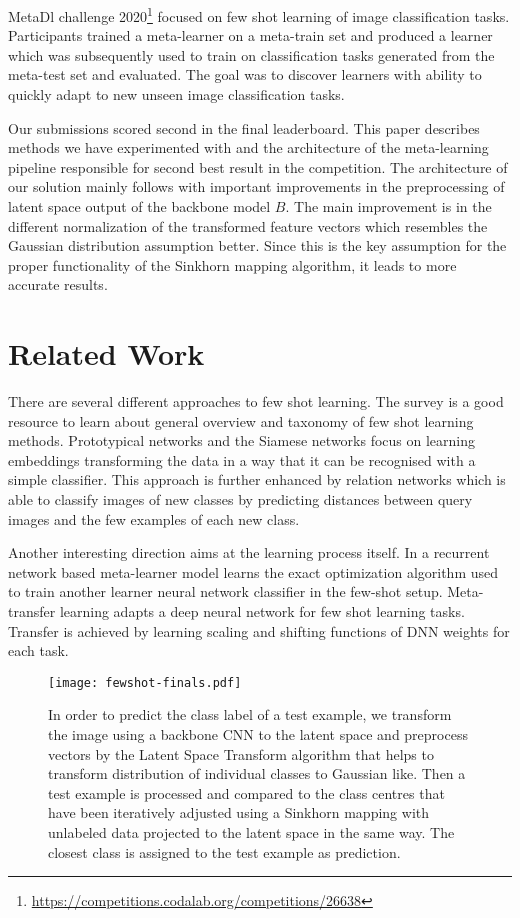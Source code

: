 \documentclass[letterpaper]{article} \usepackage{aaai20}  \usepackage{times}  \usepackage{helvet} \usepackage{courier}  \usepackage[hyphens]{url}  \usepackage{graphicx} \urlstyle{rm} \def\UrlFont{\rm}  \usepackage{graphicx}  \frenchspacing  \setlength{\pdfpagewidth}{8.5in}  \setlength{\pdfpageheight}{11in}  \usepackage[ruled,vlined]{algorithm2e}
\begin{document}
MetaDl challenge 2020\footnote{\url{https://competitions.codalab.org/competitions/26638}} focused on few shot learning of image classification tasks. Participants trained a meta-learner on a meta-train set and produced a learner which was subsequently used to train on classification tasks generated from the meta-test set and evaluated. The goal was to discover learners with ability to quickly adapt to new unseen image classification tasks. 

Our submissions scored second in the final leaderboard. This paper describes methods we have experimented with and the architecture of the meta-learning pipeline responsible for second best result in the competition.
The architecture of our solution mainly follows \cite{hu2020leveraging} with important improvements in the preprocessing of latent space output of the backbone model $B$. The main improvement is in the different normalization of the transformed feature vectors which resembles the Gaussian distribution assumption better. 
Since this is the key assumption for the proper functionality of the Sinkhorn mapping algorithm, it leads to more accurate results.

\section{Related Work}
There are several different approaches to few shot learning. The survey \cite{wang2020generalizing} is a good resource to learn about general overview and taxonomy of few shot learning methods. 
Prototypical networks \cite{snell2017prototypical} and the Siamese networks \cite{koch2015siamese} focus on learning embeddings transforming the data in a way that it can be recognised with a simple classifier. This approach is further enhanced by relation networks \cite{sung2018learning} which is able to classify images of new classes by predicting distances between query images and the few examples of each new class.

Another interesting direction aims at the learning process itself. In \cite{DBLP:conf/iclr/RaviL17} a recurrent network based meta-learner model learns the exact optimization algorithm used to train
another learner neural network classifier in the few-shot setup. Meta-transfer learning \cite{sun2019meta} adapts a deep neural network for few shot learning tasks. Transfer is achieved by learning scaling and shifting functions of DNN weights for each task.

\begin{figure*}[h]
  \texttt{[image: fewshot-finals.pdf]}
  \caption{In order to predict the class label of a test example, we transform the image using a backbone CNN to the latent space and preprocess vectors by the Latent Space Transform algorithm that helps to transform distribution of individual classes to Gaussian like. Then a test example is processed and compared to the class centres that have been iteratively adjusted using a Sinkhorn mapping with unlabeled data projected to the latent space in the same way. The closest class is assigned to the test example as prediction.}
  \label{fig:diagram}
\end{figure*}
\end{document}
